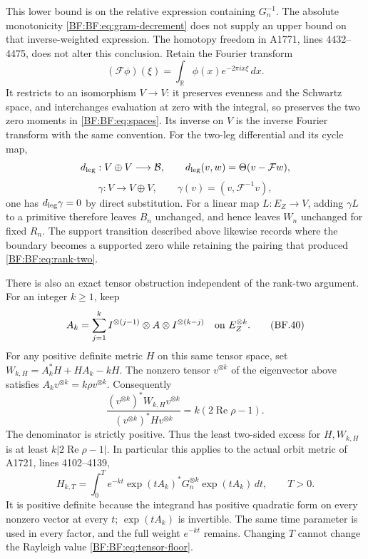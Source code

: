 This lower bound is on the relative expression containing
\(G_n^{-1}\).  The absolute monotonicity
\eqref{BF:BF:eq:gram-decrement} does not supply an upper bound on
that inverse-weighted expression.
The homotopy freedom in A1771, lines 4432--4475, does not alter
this conclusion.  Retain the Fourier transform
\[
(\mathcal F\phi)(\xi)
 =\int_{\mathbb R}\phi(x)e^{-2\pi ix\xi}\,dx.
\]
It restricts to an isomorphism \(V\to V\): it preserves evenness
and the Schwartz space, and interchanges evaluation at zero with
the integral, so preserves the two zero moments in
\eqref{BF:BF:eq:spaces}.  Its inverse on \(V\) is the inverse Fourier
transform with the same convention.
For the two-leg differential and its cycle map,
\[
d_{\rm leg}:V\oplus V\longrightarrow\mathcal B,\qquad
d_{\rm leg}(v,w)=\Theta(v-\mathcal Fw),
\]
\[
\gamma:V\longrightarrow V\oplus V,\qquad
\gamma(v)=(v,\mathcal F^{-1}v),
\]
one has \(d_{\rm leg}\gamma=0\) by direct substitution.
For a linear map \(L:E_Z\to V\), adding \(\gamma L\) to a
primitive therefore leaves \(B_n\)
unchanged, and hence leaves \(W_n\) unchanged for fixed \(R_n\).
The support transition described above likewise records where
the boundary becomes a supported zero while retaining the
pairing that produced \eqref{BF:BF:eq:rank-two}.

There is also an exact tensor obstruction independent of the
rank-two argument.  For an integer \(k\ge1\), keep
\begin{equation}
A_k=\sum_{j=1}^k
 I^{\otimes(j-1)}\otimes A\otimes I^{\otimes(k-j)}
 \quad\hbox{on }E_Z^{\otimes k}.
\tag{BF.40}\label{BF:BF:eq:tensor-generator}
\end{equation}
For any positive definite metric \(H\) on this same tensor
space, set \(W_{k,H}=A_k^*H+HA_k-kH\).
The nonzero tensor \(v^{\otimes k}\) of the eigenvector above
satisfies \(A_kv^{\otimes k}=k\rho v^{\otimes k}\).
Consequently
\begin{equation}
\frac{(v^{\otimes k})^*W_{k,H}v^{\otimes k}}
     {(v^{\otimes k})^*H v^{\otimes k}}
 =k(2\operatorname{Re}\rho-1).
\tag{BF.41}\label{BF:BF:eq:tensor-floor}
\end{equation}
The denominator is strictly positive.
Thus the least two-sided excess for \(H,W_{k,H}\) is at least
\(k|2\operatorname{Re}\rho-1|\).
In particular this applies to the actual orbit metric of
A1721, lines 4102--4139,
\[
H_{k,T}
 =\int_0^T e^{-kt}\exp(tA_k)^*G_n^{\otimes k}
                       \exp(tA_k)\,dt,\qquad T>0.
\]
It is positive definite because the integrand has positive
quadratic form on every nonzero vector at every \(t\);
\(\exp(tA_k)\) is invertible.
The same time parameter is used in every factor, and the full
weight \(e^{-kt}\) remains.  Changing \(T\) cannot change the
Rayleigh value \eqref{BF:BF:eq:tensor-floor}.

